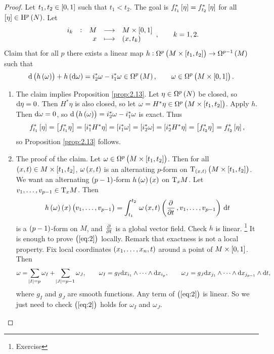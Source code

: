\begin{proof}
Let $ t_1, t_2 \in \sbr{0, 1} $ such that $ t_1 < t_2 $. The goal is $ f_{t_1}^*\sbr{\eta} = f_{t_2}^*\sbr{\eta} $ for all $ \sbr{\eta} \in \H^p\br{N} $. Let
$$ \function[i_k]{M}{M \times \sbr{0, 1}}{x}{\br{x, t_k}}, \qquad k = 1, 2. $$
Claim that for all $ p $ there exists a linear map $ h : \Omega^p\br{M \times \sbr{t_1, t_2}} \to \Omega^{p - 1}\br{M} $ such that
\begin{equation}
\label{eq:2}
\d\br{h\br{\omega}} + h\br{\d\omega} = i_2^*\omega - i_1^*\omega \in \Omega^p\br{M}, \qquad \omega \in \Omega^p\br{M \times \sbr{0, 1}}.
\end{equation}
\begin{enumerate}[label=Step \arabic*., leftmargin=0.5in]
\item The claim implies Proposition \ref{prop:2.13}. Let $ \eta \in \Omega^p\br{N} $ be closed, so $ \mathrm{d}\eta = 0 $. Then $ H^*\eta $ is also closed, so let $ \omega = H^*\eta \in \Omega^p\br{M \times \sbr{t_1, t_2}} $. Apply $ h $. Then $ \mathrm{d}\omega = 0 $, so $ \d\br{h\br{\omega}} = i_2^*\omega - i_1^*\omega $ is exact. Thus
$$ f_{t_1}^*\sbr{\eta} = \sbr{f_{t_1}^*\eta} = \sbr{i_1^*H^*\eta} = \sbr{i_1^*\omega} = \sbr{i_2^*\omega} = \sbr{i_2^*H^*\eta} = \sbr{f_{t_2}^*\eta} = f_{t_2}^*\sbr{\eta}, $$
so Proposition \ref{prop:2.13} follows.


\item The proof of the claim. Let $ \omega \in \Omega^p\br{M \times \sbr{t_1, t_2}} $. Then for all $ \br{x, t} \in M \times \sbr{t_1, t_2} $, $ \omega\br{x, t} $ is an alternating $ p $-form on $ \T_{\br{x, t}}\br{M \times \sbr{t_1, t_2}} $. We want an alternating $ \br{p - 1} $-form $ h\br{\omega}\br{x} $ on $ \mathrm{T}_xM $. Let $ v_1, \dots, v_{p - 1} \in \mathrm{T}_xM $. Then
$$ h\br{\omega}\br{x}\br{v_1, \dots, v_{p - 1}} = \intd{t_1}{t_2}{\omega\br{x, t}\br{\dpd{}{t}, v_1, \dots, v_{p - 1}}}{t} $$
is a $ \br{p - 1} $-form on $ M $, and $ \tpd{}{t} $ is a global vector field. Check $ h $ is linear. \footnote{Exercise} It is enough to prove $ \br{\ref{eq:2}} $ locally. Remark that exactness is not a local property. Fix local coordinates $ \br{x_1, \dots, x_n, t} $ around a point of $ M \times \sbr{0, 1} $. Then
$$ \omega = \sum_{\abs{I} = p} \omega_I + \sum_{\abs{J} = p - 1} \omega_J, \qquad \omega_I = g_I\mathrm{d} x_{i_1} \wedge \dots \wedge \mathrm{d} x_{i_p}, \qquad \omega_J = g_J\mathrm{d} x_{j_1} \wedge \dots \wedge \mathrm{d} x_{j_{p - 1}} \wedge \mathrm{d} t, $$
where $ g_I $ and $ g_J $ are smooth functions. Any term of $ \br{\ref{eq:2}} $ is linear. So we just need to check $ \br{\ref{eq:2}} $ holds for $ \omega_I $ and $ \omega_J $.


\end{enumerate}
\end{proof}
